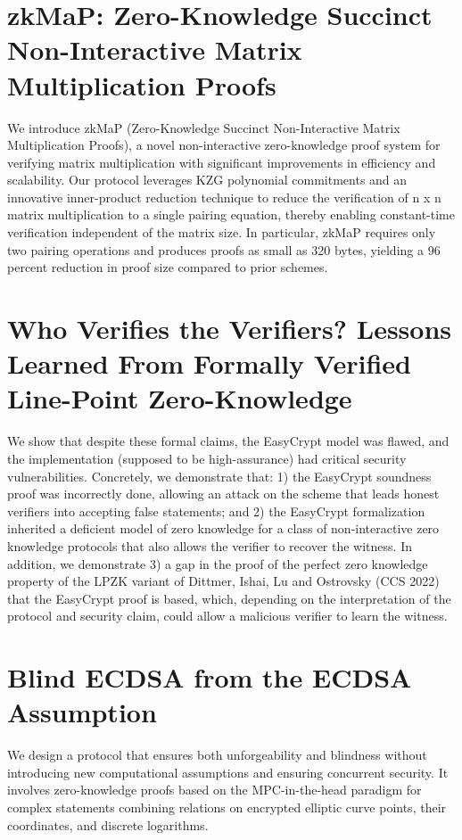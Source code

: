 \documentclass[11pt,oneside]{book}
\theoremstyle{definition}
\theoremstyle{remark}
\theoremstyle{plain}
\begin{document}
\section{\cite{10.62056/angy11fgx} zkMaP: Zero-Knowledge Succinct Non-Interactive Matrix Multiplication Proofs}
We introduce zkMaP (Zero-Knowledge Succinct Non-Interactive Matrix Multiplication Proofs), a novel non-interactive zero-knowledge proof system for verifying matrix multiplication with significant improvements in efficiency and scalability. Our protocol leverages KZG polynomial commitments and an innovative inner-product reduction technique to reduce the verification of n x n matrix multiplication to a single pairing equation, thereby enabling constant-time verification independent of the matrix size. In particular, zkMaP requires only two pairing operations and produces proofs as small as 320 bytes, yielding a 96 percent reduction in proof size compared to prior schemes.
\section{\cite{10.62056/a0wa0lmol,cryptoeprint:2025/1835} Who Verifies the Verifiers? Lessons Learned From Formally Verified Line-Point Zero-Knowledge}
We show that despite these formal claims, the EasyCrypt model was flawed, and the implementation (supposed to be high-assurance) had critical security vulnerabilities. Concretely, we demonstrate that: 1) the EasyCrypt soundness proof was incorrectly done, allowing an attack on the scheme that leads honest verifiers into accepting false statements; and 2) the EasyCrypt formalization inherited a deficient model of zero knowledge for a class of non-interactive zero knowledge protocols that also allows the verifier to recover the witness. In addition, we demonstrate 3) a gap in the proof of the perfect zero knowledge property of the LPZK variant of Dittmer, Ishai, Lu and Ostrovsky (CCS 2022) that the EasyCrypt proof is based, which, depending on the interpretation of the protocol and security claim, could allow a malicious verifier to learn the witness.
\section{\cite{10.62056/ahjbhee-3,cryptoeprint:2025/1827} Blind ECDSA from the ECDSA Assumption}
We design a protocol that ensures both unforgeability and blindness without introducing new computational assumptions and ensuring concurrent security. It involves zero-knowledge proofs based on the MPC-in-the-head paradigm for complex statements combining relations on encrypted elliptic curve points, their coordinates, and discrete logarithms.

%
%
\printbibliography
\end{document}
